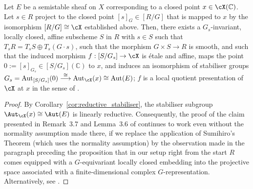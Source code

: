 \begin{Prop}\label{prop:slice}
Let $E$ be a semi\-stable sheaf on $X$ corresponding to a closed point $x \in \cX (\mathbb{C})$. Let $s \in R$ project to the closed point $[s]_{G} \in [R/G]$ that is mapped to $x$ by the isomorphism $[R/G] \cong \cX$ established above. Then, there exists a $G_s$-invariant, locally closed, affine subscheme $S$ in $R$ with $s \in S$ such that $T_sR = T_sS \oplus T_s(G\cdot s)$, such that the morphism $G \times S \to R$ is smooth, and such that the induced morphism $f: [S/G_s] \to \cX$ is étale and affine, maps the point $0 :=[s]_{G_s} \in [S/G_s] (\mathbb{C})$ to $x$, and induces an isomorphism of stabiliser groups $G_s = \mathrm{Aut}_{[S/G_s]}(0) \overset{\cong}{\longrightarrow}\mathrm{Aut}_{\cX}(x) \cong \mathrm{Aut}(E)$; \ie $f$ is a local quotient presentation of $\cX$ at $x$ in the sense of \cite[Def.\,2.1]{AlperFS}.
\end{Prop}
\begin{proof}
By Corollary~\ref{cor:reductive_stabiliser}, the stabiliser subgroup $\Aut_{\cX}(x) \cong \Aut(E)$ is linearly reductive. Consequently, the proof of the claim presented in Remark~3.7 and Lemma~3.6 of \cite{AlperKresch} continues to work even without the normality assumption made there, if we replace the application of Sumihiro's Theorem (which uses the normality assumption) by the observation made in the paragraph preceding the proposition that in our setup right from the start $R$ comes equipped with a $G$-equivariant locally closed embedding into the projective space associated with a finite-dimensional complex $G$-representation. Alternatively, see \cite[Props.~9.6 and 9.7]{JoyceSong}.
\end{proof}

